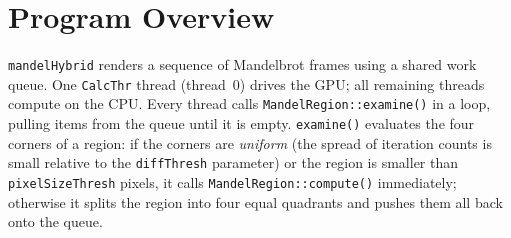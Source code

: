 \documentclass[
	english,
	letterpaper, oneside
]{article}
\begin{document}
\templatePagecfg

\templateFinalcfg


\inserttitle

\begin{abstract}
This report documents the instrumentation added to \texttt{mandelHybrid},
a hybrid CPU+GPU Mandelbrot set renderer that uses adaptive region splitting
as its load-balancing strategy. Two complementary profiling mechanisms were
introduced: NVTX (NVIDIA Tools Extension) annotations, which label regions
of CPU code so that Nsight Systems can render them as colored spans on a
per-thread timeline, and CUDA event timing, which uses GPU-side hardware
timestamps to measure kernel execution and device-to-host transfer time
independently of any CPU clock. The results show that the GPU thread is
approximately 40$\times$ faster per region than a single CPU thread,
naturally pulling 77\% of all work-queue items. All 12 threads (1 GPU + 11
CPU) finish within roughly 2 seconds of each other, demonstrating that the
dynamic work queue achieves good load balance. The dominant finding is that
\texttt{cudaMemcpy} spends 99.9\% of its reported time waiting for the GPU
kernel to finish—the actual device-to-host data transfer takes only 15~µs on
average, not 13.4~ms as the CUDA API summary suggests.
\end{abstract}

\section{Program Overview}

\texttt{mandelHybrid} renders a sequence of Mandelbrot frames using a
shared work queue. One \texttt{CalcThr} thread (thread~0) drives the GPU;
all remaining threads compute on the CPU. Every thread calls
\texttt{MandelRegion::examine()} in a loop, pulling items from the queue
until it is empty. \texttt{examine()} evaluates the four corners of a
region: if the corners are \emph{uniform} (the spread of iteration counts
is small relative to the \texttt{diffThresh} parameter) or the region is
smaller than \texttt{pixelSizeThresh} pixels, it calls
\texttt{MandelRegion::compute()} immediately; otherwise it splits the
region into four equal quadrants and pushes them all back onto the queue.
\end{document}
